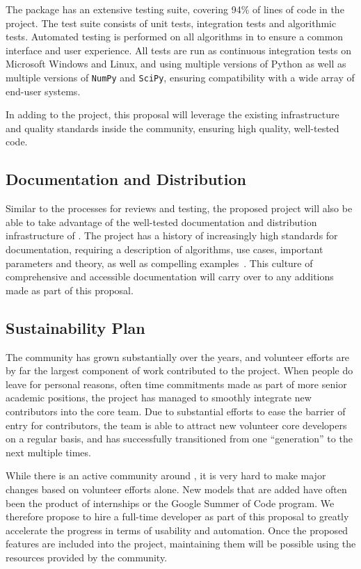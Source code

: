 The \sklearn{} package has an extensive testing suite, covering 94\% of lines of code in the project.
The test suite consists of unit tests, integration tests and algorithmic tests.
Automated testing is performed on all algorithms in \sklearn{} to ensure a common
interface and user experience.
All tests are run as continuous integration tests on Microsoft Windows and Linux, and using
multiple versions of Python as well as multiple versions of \texttt{NumPy} and \texttt{SciPy}, ensuring
compatibility with a wide array of end-user systems.

In adding to the \sklearn{} project, this proposal will leverage the existing infrastructure
and quality standards inside the \sklearn{} community, ensuring high quality, well-tested code.

\subsection{Documentation and Distribution}
Similar to the processes for reviews and testing, the proposed project will
also be able to take advantage of the well-tested documentation and distribution
infrastructure of \sklearn{}.
The \sklearn{} project has a history of increasingly high standards for
documentation, requiring a description of algorithms, use cases, important
parameters and theory, as well as compelling examples~\autocite{lovesklearn,
benlorica}. This culture of comprehensive and accessible documentation will
carry over to any additions made as part of this proposal.

\subsection{Sustainability Plan}
The \sklearn{} community has grown substantially over the years, and volunteer efforts
are by far the largest component of work contributed to the project.
When people do leave for personal reasons, often time commitments made as part
of more senior academic positions, the project has managed to smoothly integrate new
contributors into the core team. Due to substantial efforts to ease the barrier
of entry for contributors, the \sklearn{} team is able to attract new volunteer
core developers on a regular basis, and has successfully transitioned from one
``generation'' to the next multiple times. 

While there is an active community around \sklearn{}, it is very hard to make
major changes based on volunteer efforts alone. New models that are added have
often been the product of internships or the Google Summer of Code program.  We
therefore propose to hire a full-time developer as part of this proposal to
greatly accelerate the progress in terms of usability and automation. Once
the proposed features are included into the project, maintaining them will be
possible using the resources provided by the community. 


